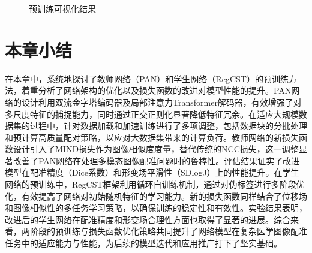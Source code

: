 \begin{figure}[h]
    \centering
    \caption{预训练可视化结果}
\end{figure}

\section{本章小结}
在本章中，系统地探讨了教师网络（PAN）和学生网络（RegCST）的预训练方法，着重分析了网络架构的优化以及损失函数的改进对模型性能的提升。PAN网络的设计利用双流金字塔编码器及局部注意力Transformer解码器，有效增强了对多尺度特征的捕捉能力，同时通过正交正则化显著降低特征冗余。在适应大规模数据集的过程中，针对数据加载和加速训练进行了多项调整，包括数据块的分批处理和预计算高质量配对策略，以应对大数据集带来的计算负荷。教师网络的新损失函数设计引入了MIND损失作为图像相似度度量，替代传统的NCC损失，这一调整显著改善了PAN网络在处理多模态图像配准问题时的鲁棒性。评估结果证实了改进模型在配准精度（Dice系数）和形变场平滑性（SDlogJ）上的性能提升。在学生网络的预训练中，RegCST框架利用循环自训练机制，通过对伪标签进行多阶段优化，有效提高了网络对初始随机特征的学习能力。新的损失函数同样结合了位移场和图像相似性的多任务学习策略，以确保训练的稳定性和有效性。实验结果表明，改进后的学生网络在配准精度和形变场合理性方面也取得了显著的进展。综合来看，两阶段的预训练与损失函数优化策略共同提升了网络模型在复杂医学图像配准任务中的适应能力与性能，为后续的模型迭代和应用推广打下了坚实基础。


